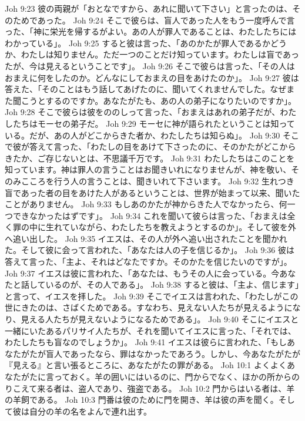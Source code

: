 Joh 9:23  彼の両親が「おとなですから、あれに聞いて下さい」と言ったのは、そのためであった。
Joh 9:24  そこで彼らは、盲人であった人をもう一度呼んで言った、「神に栄光を帰するがよい。あの人が罪人であることは、わたしたちにはわかっている」。
Joh 9:25  すると彼は言った、「あのかたが罪人であるかどうか、わたしは知りません。ただ一つのことだけ知っています。わたしは盲であったが、今は見えるということです」。
Joh 9:26  そこで彼らは言った、「その人はおまえに何をしたのか。どんなにしておまえの目をあけたのか」。
Joh 9:27  彼は答えた、「そのことはもう話してあげたのに、聞いてくれませんでした。なぜまた聞こうとするのですか。あなたがたも、あの人の弟子になりたいのですか」。
Joh 9:28  そこで彼らは彼をののしって言った、「おまえはあれの弟子だが、わたしたちはモーセの弟子だ。
Joh 9:29  モーセに神が語られたということは知っている。だが、あの人がどこからきた者か、わたしたちは知らぬ」。
Joh 9:30  そこで彼が答えて言った、「わたしの目をあけて下さったのに、そのかたがどこからきたか、ご存じないとは、不思議千万です。
Joh 9:31  わたしたちはこのことを知っています。神は罪人の言うことはお聞きいれになりませんが、神を敬い、そのみこころを行う人の言うことは、聞きいれて下さいます。
Joh 9:32  生れつき盲であった者の目をあけた人があるということは、世界が始まって以来、聞いたことがありません。
Joh 9:33  もしあのかたが神からきた人でなかったら、何一つできなかったはずです」。
Joh 9:34  これを聞いて彼らは言った、「おまえは全く罪の中に生れていながら、わたしたちを教えようとするのか」。そして彼を外へ追い出した。
Joh 9:35  イエスは、その人が外へ追い出されたことを聞かれた。そして彼に会って言われた、「あなたは人の子を信じるか」。
Joh 9:36  彼は答えて言った、「主よ、それはどなたですか。そのかたを信じたいのですが」。
Joh 9:37  イエスは彼に言われた、「あなたは、もうその人に会っている。今あなたと話しているのが、その人である」。
Joh 9:38  すると彼は、「主よ、信じます」と言って、イエスを拝した。
Joh 9:39  そこでイエスは言われた、「わたしがこの世にきたのは、さばくためである。すなわち、見えない人たちが見えるようになり、見える人たちが見えないようになるためである」。
Joh 9:40  そこにイエスと一緒にいたあるパリサイ人たちが、それを聞いてイエスに言った、「それでは、わたしたちも盲なのでしょうか」。
Joh 9:41  イエスは彼らに言われた、「もしあなたがたが盲人であったなら、罪はなかったであろう。しかし、今あなたがたが『見える』と言い張るところに、あなたがたの罪がある。
Joh 10:1  よくよくあなたがたに言っておく。羊の囲いにはいるのに、門からでなく、ほかの所からのりこえて来る者は、盗人であり、強盗である。
Joh 10:2  門からはいる者は、羊の羊飼である。
Joh 10:3  門番は彼のために門を開き、羊は彼の声を聞く。そして彼は自分の羊の名をよんで連れ出す。
